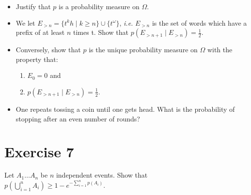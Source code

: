 \documentclass{article}
\begin{document}
\begin{itemize}
\item Justify that $p$ is a probability measure on $\Omega$.
\item We let $E_{{>}n} = \{t^k h \mid k \ge n \} \cup \{t^{\omega}\}$, \emph{i.e.} $E_{{>}n}$ is the set of words which have a prefix of at least $n$ times t. Show that $p(E_{{>}n+1} \mid E_{{>}n} ) = \frac{1}{2}$.
\item Conversely, show that $p$ is the unique probability measure on $\Omega$ with the property that:
  \begin{enumerate}
  \item $E_0 = 0$ and
  \item $p(E_{{>}n+1} \mid E_{{>}n} ) = \frac{1}{2}$. 
  \end{enumerate}
\item One repeats tossing a coin until one gets head. What is the probability of stopping after an even number of rounds?
\end{itemize}



\section*{Exercise 7}
Let $A_1 \dots A_n$ be $n$ independent events. Show that $p(\bigcup^n_{i=1} A_i) \ge 1 - e^{-\sum_{i=1}^n p(A_i)}$.

\end{document}
